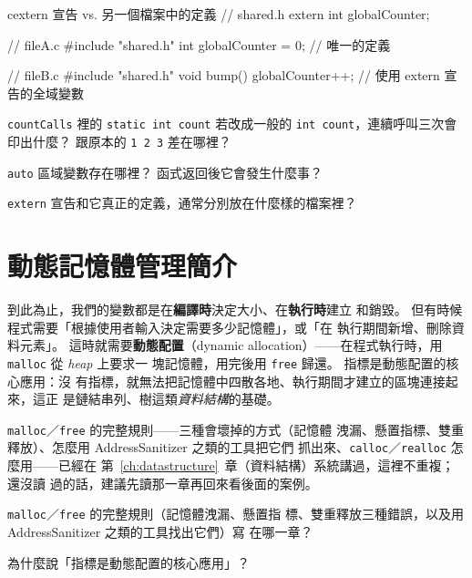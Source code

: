 \begin{code}{c}{extern 宣告 vs. 另一個檔案中的定義}
// shared.h
extern int globalCounter;

// fileA.c
#include "shared.h"
int globalCounter = 0;   // 唯一的定義

// fileB.c
#include "shared.h"
void bump() { globalCounter++; }  // 使用 extern 宣告的全域變數
\end{code}


\begin{drills}[label=drills:ext-storage-class]
\item \texttt{countCalls} 裡的 \texttt{static int count} 若改成一般的
\texttt{int count}，連續呼叫三次會印出什麼？ 跟原本的 \texttt{1 2 3}
差在哪裡？
\item \texttt{auto} 區域變數存在哪裡？ 函式返回後它會發生什麼事？
\item \texttt{extern} 宣告和它真正的定義，通常分別放在什麼樣的檔案裡？
\end{drills}

\section{動態記憶體管理簡介}
\label{sec:ext-dynamic-memory}

到此為止，我們的變數都是在\textbf{編譯時}決定大小、在\textbf{執行時}建立
和銷毀。 但有時候程式需要「根據使用者輸入決定需要多少記憶體」，或「在
執行期間新增、刪除資料元素」。 這時就需要\textbf{動態配置}（dynamic
allocation）——在程式執行時，用 \texttt{malloc} 從 \emph{heap} 上要求一
塊記憶體，用完後用 \texttt{free} 歸還。 指標是動態配置的核心應用：沒
有指標，就無法把記憶體中四散各地、執行期間才建立的區塊連接起來，這正
是鏈結串列、樹這類\emph{資料結構}的基礎。

\texttt{malloc}／\texttt{free} 的完整規則——三種會壞掉的方式（記憶體
洩漏、懸置指標、雙重釋放）、怎麼用 AddressSanitizer 之類的工具把它們
抓出來、\texttt{calloc}／\texttt{realloc} 怎麼用——已經在
第~\ref{ch:datastructure}~章（資料結構）系統講過，這裡不重複；還沒讀
過的話，建議先讀那一章再回來看後面的案例。

\begin{drills}[label=drills:ext-dynamic-memory]
\item \texttt{malloc}／\texttt{free} 的完整規則（記憶體洩漏、懸置指
標、雙重釋放三種錯誤，以及用 AddressSanitizer 之類的工具找出它們）寫
在哪一章？
\item 為什麼說「指標是動態配置的核心應用」？
\end{drills}

